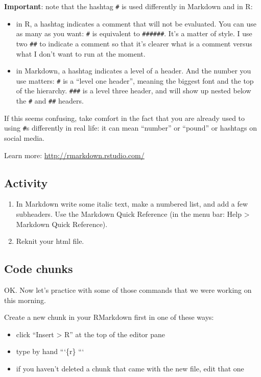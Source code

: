 \documentclass[]{book}
\providecommand{\tightlist}{%
  \setlength{\itemsep}{0pt}\setlength{\parskip}{0pt}}
\begin{document}
\textbf{Important}: note that the hashtag \texttt{\#} is used differently in Markdown and in R:

\begin{itemize}
\tightlist
\item
  in R, a hashtag indicates a comment that will not be evaluated. You can use as many as you want: \texttt{\#} is equivalent to \texttt{\#\#\#\#\#\#}. It's a matter of style. I use two \texttt{\#\#} to indicate a comment so that it's clearer what is a comment versus what I don't want to run at the moment.
\item
  in Markdown, a hashtag indicates a level of a header. And the number you use matters: \texttt{\#} is a ``level one header'', meaning the biggest font and the top of the hierarchy. \texttt{\#\#\#} is a level three header, and will show up nested below the \texttt{\#} and \texttt{\#\#} headers.
\end{itemize}

If this seems confusing, take comfort in the fact that you are already used to using \texttt{\#}s differently in real life: it can mean ``number'' or ``pound'' or hashtags on social media.

Learn more: \url{http://rmarkdown.rstudio.com/}

\hypertarget{activity}{%
\subsection{Activity}\label{activity}}

\begin{enumerate}
\def\labelenumi{\arabic{enumi}.}
\tightlist
\item
  In Markdown write some italic text, make a numbered list, and add a few subheaders.
  Use the Markdown Quick Reference (in the menu bar: Help \textgreater{} Markdown Quick Reference).
\item
  Reknit your html file.
\end{enumerate}

\hypertarget{code-chunks}{%
\subsection{Code chunks}\label{code-chunks}}

OK. Now let's practice with some of those commands that we were working on this morning.

Create a new chunk in your RMarkdown first in one of these ways:

\begin{itemize}
\tightlist
\item
  click ``Insert \textgreater{} R'' at the top of the editor pane
\item
  type by hand
  ```\{r\}
  ```
\item
  if you haven't deleted a chunk that came with the new file, edit that one
\end{itemize}
\end{document}

